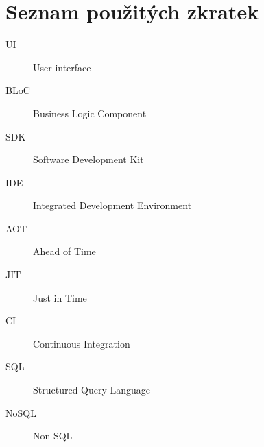 \chapter{Seznam použitých zkratek}

\begin{description}
	\item[UI] User interface
	\item[BLoC] Business Logic Component 
	\item[SDK] Software Development Kit
	\item[IDE] Integrated Development Environment
	\item[AOT] Ahead of Time
	\item[JIT] Just in Time
	\item[CI] Continuous Integration 
	\item[SQL] Structured Query Language
	\item[NoSQL] Non SQL
\end{description}
